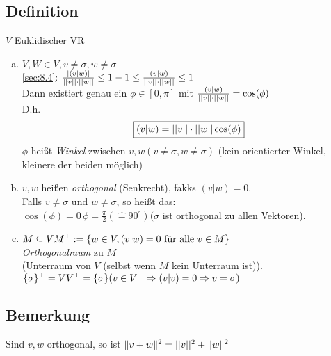 \subsection{Definition}\label{sec:\thesubsection}
$V$ Euklidischer VR
\begin{enumerate}[a)]
\item $V,W \in V, v \ne \sigma,w \ne \sigma$\\
\ref{sec:8.4}: $\frac{\lvert (v|w) \rvert}{\lvert \lvert v \rvert \rvert \cdot \lvert \lvert w \rvert \rvert} \leq 1\\
-1 \leq \frac{(v|w)}{\lvert \lvert v \rvert \rvert \cdot \lvert \lvert w \rvert \rvert} \leq 1$\\
Dann existiert genau ein $\phi \in [0,\pi]$ mit $\frac{(v|w)}{\lvert \lvert v \rvert \rvert \cdot \lvert \lvert w \rvert \rvert} = \cos(\phi) $\\
D.h.
\begin{equation*}
\boxed{(v|w) = {\lvert \lvert v \rvert \rvert \cdot \lvert \lvert w \rvert \rvert \cos(\phi)}}
\end{equation*}
$\phi$ hei\ss t \emph{Winkel} zwischen $v,w (v \ne \sigma, w \ne \sigma)$ (kein orientierter Winkel, kleinere der beiden möglich)
\item $v,w$ hei\ss en \emph{orthogonal} (Senkrecht), fakks $(v|w) = 0$.\\
Falls $v \ne \sigma$ und $w \ne \sigma$, so hei\ss t das:\\
$\cos(\phi) = 0\,\phi = \frac{\pi}{2} (\hat{=} 90^{\circ}) (\sigma $ ist orthogonal zu allen Vektoren).
\item $M \subseteq V\\
M^{\perp} := \{w \in V, (v|w) = 0 \text{ für alle }v \in M  \}$\\
\emph{Orthogonalraum} zu $M$\\
(Unterraum von $V$ (selbst wenn $M$ kein Unterraum ist)).\\
$\{ \sigma \}^{\perp} = V\\
V^{\perp} = \{ \sigma \}
(v \in V^{\perp} \Rightarrow (v|v) = 0 \Rightarrow v = \sigma)$
\end{enumerate}
\subsection{Bemerkung}\label{sec:\thesubsection}
Sind $v,w$ orthogonal, so ist $\Vert v + w\Vert^2 = \lvert \lvert v \rvert \rvert^2 + \Vert w\Vert^2$
